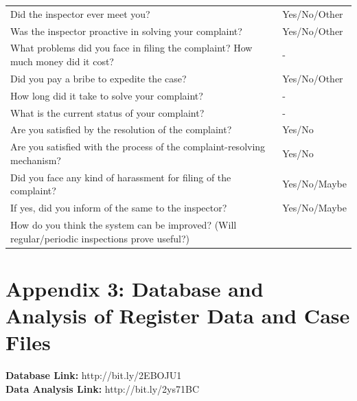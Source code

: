 \documentclass[a4paper, 12pt, twoside]{article}
\begin{document}
\begin{table}[H]
\begin{mdframed}[backgroundcolor=gray!20]
	\begin{tabular}{L{10cm}L{4cm}}
	Did the inspector ever meet you? & Yes/No/Other\\
	Was the inspector proactive in solving your complaint? & Yes/No/Other\\
	What problems did you face in filing the complaint? How much money did it cost? & -\\
	Did you pay a bribe to expedite the case? & Yes/No/Other\\
	How long did it take to solve your complaint? & -\\
	What is the current status of your complaint? & -\\
	Are you satisfied by the resolution of the complaint? & Yes/No\\
	Are you satisfied with the process of the complaint-resolving mechanism? & 
	Yes/No\\
	Did you face any kind of harassment for filing of the complaint? & Yes/No/Maybe\\
	 If yes, did you inform of the same to the inspector? & Yes/No/Maybe\\
	 How do you think the system can be improved? (Will regular/periodic inspections prove useful?) &  \\
	\end{tabular}	
	\end{mdframed}
\end{table}

\newpage      
\section*{Appendix 3: Database and Analysis of Register Data and Case Files}

\textbf{Database Link:} 
http://bit.ly/2EBOJU1 \\ 


\textbf{Data Analysis Link:} 
http://bit.ly/2ys71BC
\end{document}
